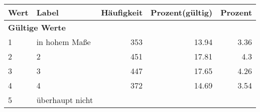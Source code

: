      \begin{longtable}{lXrrr}
     \toprule
     \textbf{Wert} & \textbf{Label} & \textbf{Häufigkeit} & \textbf{Prozent(gültig)} & \textbf{Prozent} \\
     \endhead
     \midrule
     \multicolumn{5}{l}{\textbf{Gültige Werte}}\\

     1 &
     \multicolumn{1}{X}{ in hohem Maße   } &


       \num{353} &
       \num[round-mode=places,round-precision=2]{13.94} &
         \num[round-mode=places,round-precision=2]{3.36} \\

     2 &
     \multicolumn{1}{X}{ 2   } &


       \num{451} &
       \num[round-mode=places,round-precision=2]{17.81} &
         \num[round-mode=places,round-precision=2]{4.3} \\

     3 &
     \multicolumn{1}{X}{ 3   } &


       \num{447} &
       \num[round-mode=places,round-precision=2]{17.65} &
         \num[round-mode=places,round-precision=2]{4.26} \\

     4 &
     \multicolumn{1}{X}{ 4   } &


       \num{372} &
       \num[round-mode=places,round-precision=2]{14.69} &
         \num[round-mode=places,round-precision=2]{3.54} \\

     5 &
     \multicolumn{1}{X}{ überhaupt nicht   } &



\end{longtable}
